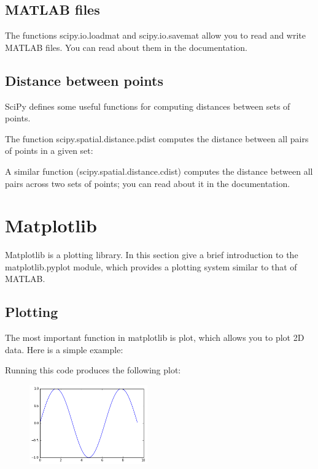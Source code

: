\documentclass[10pt,a4paper]{article}
\begin{document}
\subsection{MATLAB files}

The functions scipy.io.loadmat and scipy.io.savemat allow you to read and write MATLAB files. You can read about them in the documentation.


\subsection{Distance between points}

SciPy defines some useful functions for computing distances between sets of points.


The function scipy.spatial.distance.pdist computes the distance between all pairs of points in a given set:


A similar function (scipy.spatial.distance.cdist) computes the distance between all pairs across two sets of points; you can read about it in the documentation.


\section{Matplotlib}

Matplotlib is a plotting library. In this section give a brief introduction to the matplotlib.pyplot module, which provides a plotting system similar to that of MATLAB.


\subsection{Plotting}

The most important function in matplotlib is plot, which allows you to plot 2D data. Here is a simple example:


Running this code produces the following plot:
\begin{figure}[htbp]
        \centering
        \includegraphics[width=2in]{images/sine.png}
\end{figure}
\end{document}
